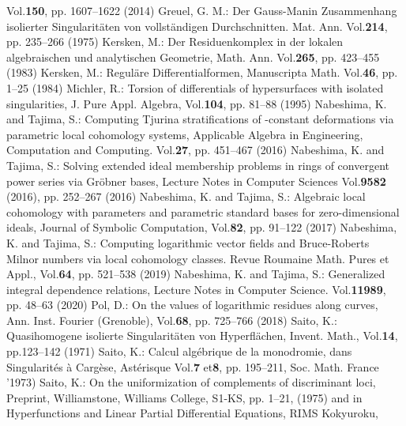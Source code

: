 \documentclass{arxsigma}
\begin{document}
\begin{thebibliography}{99}
Vol.{\bf 150}, pp. 1607--1622 (2014)
Greuel, G. M.:
\newblock Der Gauss-Manin Zusammenhang isolierter Singularit\"aten von vollst\"andigen Durchschnitten.
\newblock Mat. Ann.
Vol.{\bf 214}, pp. 235--266 (1975)
Kersken, M.:
\newblock Der Residuenkomplex in der lokalen algebraischen und analytischen Geometrie,
\newblock Math. Ann. Vol.{\bf 265}, pp. 423--455 (1983)
Kersken, M.:
\newblock Regul\"are Differentialformen,
\newblock Manuscripta Math.
Vol.{\bf 46}, pp. 1--25 (1984)
Michler, R.:
\newblock Torsion of differentials of hypersurfaces with isolated singularities,
\newblock J. Pure Appl. Algebra,
Vol.{\bf 104}, pp. 81--88 (1995)
Nabeshima, K.
and Tajima, S.:
\newblock Computing Tjurina stratifications of  -constant
deformations via parametric local cohomology systems,
\newblock Applicable Algebra in Engineering, Computation and Computing.
Vol.{\bf 27}, pp. 451--467 (2016)
Nabeshima, K.
and Tajima, S.:
\newblock Solving extended ideal membership problems in rings of
convergent power series via Gr\"obner bases,
\newblock Lecture Notes in Computer Sciences
Vol.{\bf 9582} (2016), pp. 252--267 (2016)
Nabeshima, K.
and Tajima, S.:
\newblock Algebraic local cohomology with parameters and
parametric standard bases for zero-dimensional ideals,
\newblock Journal of Symbolic Computation,
Vol.{\bf 82}, pp. 91--122 (2017)
Nabeshima, K. and Tajima, S.:
\newblock Computing logarithmic vector fields and Bruce-Roberts Milnor numbers via local cohomology classes.
\newblock Revue Roumaine Math. Pures et Appl.,
Vol.{\bf 64}, pp. 521--538 (2019)
Nabeshima, K.
and Tajima, S.:
\newblock Generalized integral dependence relations,
\newblock Lecture Notes in Computer Science.
Vol.{\bf 11989}, pp. 48--63 (2020)
Pol, D.:
\newblock On the values of logarithmic residues along curves,
\newblock Ann. Inst. Fourier (Grenoble),
Vol.{\bf 68}, pp. 725--766 (2018)
Saito, K.:
\newblock Quasihomogene isolierte Singularit\"aten von Hyperfl\"achen,
\newblock Invent. Math.,
Vol.{\bf 14}, pp.123--142 (1971)
Saito, K.:
\newblock Calcul alg\'ebrique de la monodromie, dans Singularit\'es \` a Carg\`ese,
\newblock Ast\'erisque
Vol.{\bf 7} et{\bf 8}, pp. 195--211, Soc. Math. France '1973)
Saito, K.:
\newblock On the uniformization of complements of discriminant loci,
\newblock Preprint, Williamstone, Williams College, S1-KS, pp. 1--21, (1975) and
\newblock in Hyperfunctions and Linear Partial Differential Equations, RIMS Kokyuroku,

\end{thebibliography}
\end{document}
